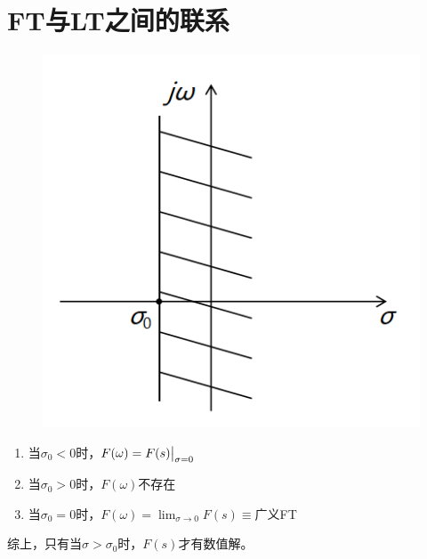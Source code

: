 \documentclass[UTF8]{ctexart}
\begin{document}
\section{FT与LT之间的联系}
\begin{figure}[h]
      \centering
      \includegraphics[scale=0.42]{LT与FT之间联系.png}
\end{figure}
\begin{enumerate}[label=(\arabic*),itemindent=0pt,labelindent=\parindent,labelwidth=2em,labelsep=5pt,leftmargin=*]
      \item 当$\sigma_0<0$时，$F(\omega)=F(s)\big{|}_{\sigma=0}$
      \item 当$\sigma_0>0$时，$F(\omega)$不存在
      \item 当$\sigma_0=0$时，$F(\omega)=\lim_{\sigma\rightarrow0}F(s)\equiv$广义FT
\end{enumerate}\par
综上，只有当$\sigma>\sigma_0$时，$F(s)$才有数值解。
\end{document}
